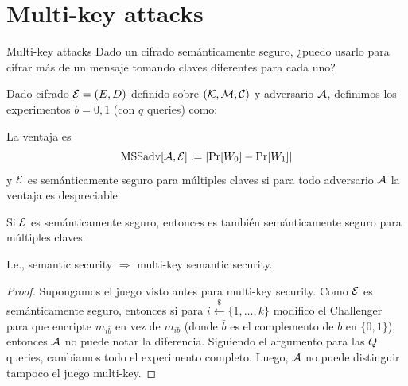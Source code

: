 \section{Multi-key attacks}
\begin{frame}[allowframebreaks]{Multi-key attacks}
  Dado un cifrado semánticamente seguro, ¿puedo usarlo para cifrar más de un mensaje tomando 
  claves diferentes para cada uno?

  \begin{definition}
    Dado cifrado $\mathcal{E} = (E, D)$ definido sobre $(\mathcal{K}, \mathcal{M}, \mathcal{C})$ y adversario $\mathcal{A}$, definimos los 
    experimentos $b = 0,1$ (con $q$ queries) como:

    \begin{centering}
    \end{centering}

    La ventaja es
    \begin{equation*}
      \text{MSSadv}[\mathcal{A}, \mathcal{E}] := \left|\text{Pr}[W_0] - \text{Pr}[W_1]\right|
    \end{equation*}
    y $\mathcal{E}$ es semánticamente seguro para múltiples claves si para todo adversario $\mathcal{A}$ la ventaja 
    es despreciable.
  \end{definition}

  \begin{theorem}
    Si $\mathcal{E}$ es semánticamente seguro, entonces es también semánticamente seguro para múltiples claves.

    I.e., semantic security $\Rightarrow$ multi-key semantic security.
  \end{theorem}
  \begin{proof}
    Supongamos el juego visto antes para multi-key security.
    Como $\mathcal{E}$ es semánticamente seguro, entonces si para $i \overset{\$}{\leftarrow} \{1, \dots, k\}$ 
    modifico el Challenger para que encripte $m_{i\bar{b}}$ en vez de $m_{ib}$ (donde
    $\bar{b}$ es el complemento de $b$ en $\{0, 1\}$), entonces $\mathcal{A}$ no puede notar la
    diferencia.
    Siguiendo el argumento para las $Q$ queries, cambiamos todo el experimento completo.
    Luego, $\mathcal{A}$ no puede distinguir tampoco el juego multi-key.
  \end{proof}
\end{frame}


